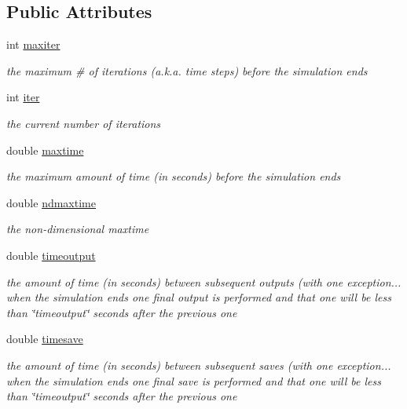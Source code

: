\subsection*{Public Attributes}
\begin{CompactItemize}
\item 
int \hyperlink{structTimeProps_o0}{maxiter}
\begin{CompactList}\small\item\em the maximum \# of iterations (a.k.a. time steps) before the simulation ends \item\end{CompactList}\item 
int \hyperlink{structTimeProps_o1}{iter}
\begin{CompactList}\small\item\em the current number of iterations \item\end{CompactList}\item 
double \hyperlink{structTimeProps_o2}{maxtime}
\begin{CompactList}\small\item\em the maximum amount of time (in seconds) before the simulation ends \item\end{CompactList}\item 
double \hyperlink{structTimeProps_o3}{ndmaxtime}
\begin{CompactList}\small\item\em the non-dimensional maxtime \item\end{CompactList}\item 
double \hyperlink{structTimeProps_o4}{timeoutput}
\begin{CompactList}\small\item\em the amount of time (in seconds) between subsequent outputs (with one exception... when the simulation ends one final output is performed and that one will be less than \char`\"{}timeoutput\char`\"{} seconds after the previous one \item\end{CompactList}\item 
double \hyperlink{structTimeProps_o5}{timesave}
\begin{CompactList}\small\item\em the amount of time (in seconds) between subsequent saves (with one exception... when the simulation ends one final save is performed and that one will be less than \char`\"{}timeoutput\char`\"{} seconds after the previous one \item\end{CompactList}\item 

\end{CompactItemize}
